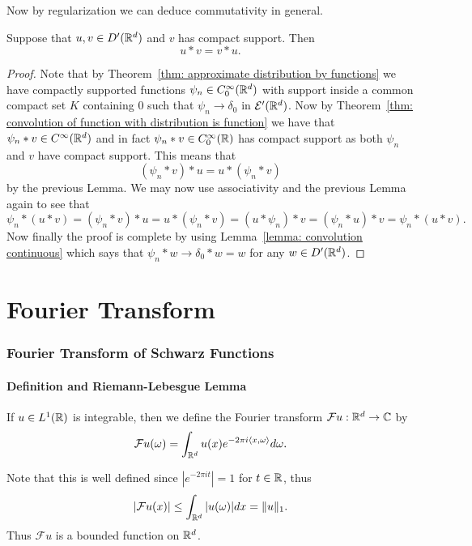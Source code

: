 \documentclass[twoside, a4paper, 10pt]{amsart}
\begin{document}
Now by regularization we can deduce commutativity in general.

\begin{thm}[Commutativity] Suppose that $u,v \in D'(\mathbb{R}^d)$ and $v$ has compact support. Then $$u*v = v*u.$$

\end{thm}

\begin{proof} Note that by Theorem~\ref{thm: approximate distribution by functions} we have compactly supported functions $\psi_n \in C_0^{\infty}(\mathbb{R}^d)$ with support inside a common compact set $K$ containing $0$ such that $\psi_n \to \delta_0$ in $\mathcal{E}'(\mathbb{R}^d)$. Now by Theorem~\ref{thm: convolution of function with distribution is function} we have that $\psi_n * v \in C^{\infty}(\mathbb{R}^d)$ and in fact $\psi_n * v \in C_0^{\infty}(\mathbb{R})$ has compact support as both $\psi_n$ and $v$ have compact support. This means that $$(\psi_n * v) *u = u * (\psi_n * v)$$ by the previous Lemma. We may now use associativity and the previous Lemma again to see that $$\psi_n * (u*v) = (\psi_n * v) * u = u * (\psi_n * v) = (u*\psi_n)*v = (\psi_n * u) * v = \psi_n * (u*v).$$ Now finally the proof is complete by using Lemma~\ref{lemma: convolution continuous} which says that $\psi_n * w \to \delta_0 * w = w$ for any $w \in D'(\mathbb{R}^d)$. \end{proof}

\part{Fourier Transform}

\section{Fourier Transform of Schwarz Functions}

\subsection{Definition and Riemann-Lebesgue Lemma}

\begin{mydef}\label{def: fourier of integrable} If $u \in L^1(\mathbb{R})$ is integrable, then we define the Fourier transform $\mathcal{F}u:\mathbb{R}^d \to \mathbb{C}$ by $$\mathcal{F}u(\omega) = \int_{\mathbb{R}^d} u(x) e^{-2\pi i \langle x, \omega \rangle } d\omega.$$

\end{mydef}

Note that this is well defined since $|e^{-2\pi it}| = 1$ for $t \in \mathbb{R}$, thus $$|\mathcal{F}u(x)| \leq \int_{\mathbb{R}^d} |u(\omega)| dx = \| u \|_1. $$ Thus $\mathcal{F}u$ is a bounded function on $\mathbb{R}^d$.
\end{document}
